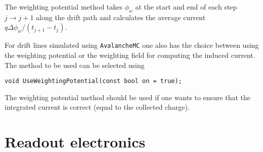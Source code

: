 The weighting potential method takes $\phi_{w}$ 
at the start and end of each step $j \rightarrow j + 1$ along the drift path
and calculates the average current $q\Delta\phi_{w}/\left(t_{j+1} - t_{j}\right)$.

For drift lines simulated using \texttt{AvalancheMC} one also has the choice 
between using the weighting potential or the weighting field for computing 
the induced current. The method to be used can be selected using
\begin{lstlisting}
void UseWeightingPotential(const bool on = true);
\end{lstlisting} 
The weighting potential method should be used if one wants to ensure that 
the integrated current is correct (equal to the collected charge).
\section{Readout electronics}

